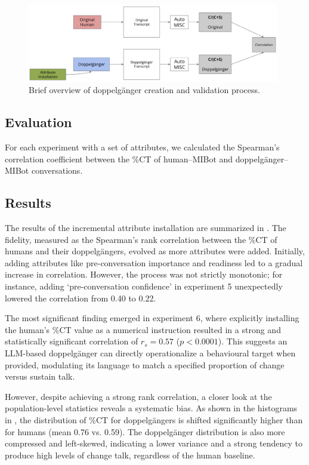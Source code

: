 \begin{figure}[htpb]
	\centering
	\includegraphics[width=0.98\textwidth]{fig/doppelganger_process.png}
	\caption[Brief overview of doppelgänger creation and validation process]{Brief overview of doppelgänger creation and validation process.}
	\label{fig:doppelgänger-creation-process}
\end{figure}

\subsection{Evaluation}
For each experiment with a set of attributes, we calculated the Spearman's correlation coefficient between the \%CT of human--MIBot and doppelgänger--MIBot conversations.



\subsection{Results}
The results of the incremental attribute installation are summarized in . The fidelity, measured as the Spearman's rank correlation between the \%CT of humans and their doppelgängers, evolved as more attributes were added. Initially, adding attributes like pre-conversation importance and readiness led to a gradual increase in correlation. However, the process was not strictly monotonic; for instance, adding `pre-conversation confidence' in experiment 5 unexpectedly lowered the correlation from 0.40 to 0.22.

The most significant finding emerged in experiment 6, where explicitly installing the human's \%CT value as a numerical instruction resulted in a strong and statistically significant correlation of $r_s = 0.57$ ($p < 0.0001$). This suggests an LLM-based doppelgänger can directly operationalize a behavioural target when provided, modulating its language to match a specified proportion of change versus sustain talk.

However, despite achieving a strong rank correlation, a closer look at the population-level statistics reveals a systematic bias. As shown in the histograms in , the distribution of \%CT for doppelgängers is shifted significantly higher than for humans (mean 0.76 vs. 0.59). The doppelgänger distribution is also more compressed and left-skewed, indicating a lower variance and a strong tendency to produce high levels of change talk, regardless of the human baseline.


